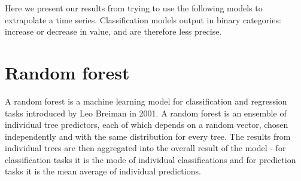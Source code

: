 Here we present our results from trying to use the following models to extrapolate a time series.
Classification models output in binary categories: increase or decrease in value, and are therefore less precise.













\section{Random forest}
A random forest \cite{random_forest} is a machine learning model for classification and regression tasks introduced by Leo Breiman in 2001. A random forest is an ensemble of individual tree predictors, each of which depends on a random vector, chosen independently and with the same distribution for every tree. The results from individual trees are then aggregated into the overall result of the model - for classification tasks it is the mode of individual classifications and for prediction tasks it is the mean average of individual predictions.

